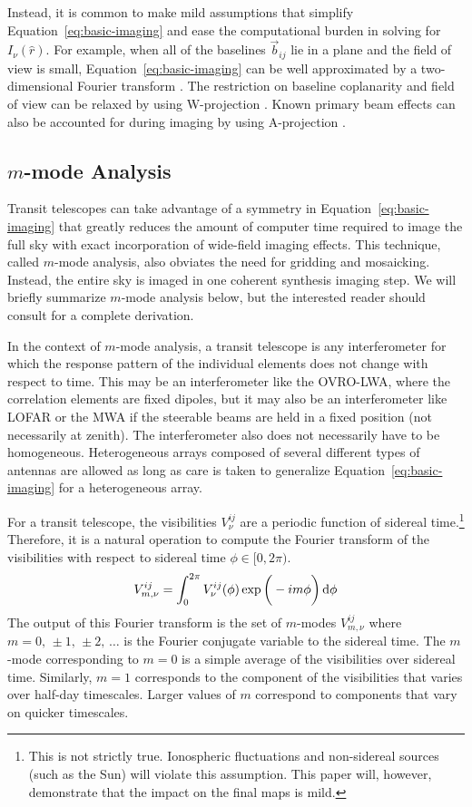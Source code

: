 \documentclass[twocolumn]{aastex61}
\renewcommand{\d}{{\rm d}}
\begin{document}
Instead, it is common to make mild assumptions that simplify Equation~\ref{eq:basic-imaging} and
ease the computational burden in solving for $I_\nu(\hat r)$. For example, when all of the baselines
$\vec b_{ij}$ lie in a plane and the field of view is small, Equation~\ref{eq:basic-imaging} can be
well approximated by a two-dimensional Fourier transform \citep{2001isra.book.....T}. The
restriction on baseline coplanarity and field of view can be relaxed by using W-projection
\citep{2008ISTSP...2..647C}. Known primary beam effects can also be accounted for during imaging by
using A-projection \citep{2013ApJ...770...91B}.

\subsection{$m$-mode Analysis}\label{sec:mmode-analysis}

Transit telescopes can take advantage of a symmetry in Equation~\ref{eq:basic-imaging} that greatly
reduces the amount of computer time required to image the full sky with exact incorporation of
wide-field imaging effects. This technique, called $m$-mode analysis, also obviates the need for
gridding and mosaicking. Instead, the entire sky is imaged in one coherent synthesis imaging step.
We will briefly summarize $m$-mode analysis below, but the interested reader should consult
\citet{2014ApJ...781...57S, 2015PhRvD..91h3514S} for a complete derivation.

In the context of $m$-mode analysis, a transit telescope is any interferometer for which the
response pattern of the individual elements does not change with respect to time. This may be an
interferometer like the OVRO-LWA, where the correlation elements are fixed dipoles, but it may also
be an interferometer like LOFAR or the MWA if the steerable beams are held in a fixed position (not
necessarily at zenith). The interferometer also does not necessarily have to be homogeneous.
Heterogeneous arrays composed of several different types of antennas are allowed as long as care is
taken to generalize Equation~\ref{eq:basic-imaging} for a heterogeneous array.

For a transit telescope, the visibilities $V^{ij}_\nu$ are a periodic function of sidereal
time.\footnote{
    This is not strictly true. Ionospheric fluctuations and non-sidereal sources (such as the Sun)
    will violate this assumption. This paper will, however, demonstrate that the impact on the final
    maps is mild.
}
Therefore, it is a natural operation to compute the Fourier transform of the visibilities with
respect to sidereal time $\phi\in[0,2\pi)$.
\begin{equation}
    V^{ij}_{m,\nu} = \int_0^{2\pi} V^{ij}_\nu(\phi)\exp\bigg(-im\phi\bigg)\,\d\phi
\end{equation}
The output of this Fourier transform is the set of $m$-modes $V^{ij}_{m,\nu}$ where
$m=0,\,\pm1,\,\pm2,\,\ldots$ is the Fourier conjugate variable to the sidereal time. The $m$-mode
corresponding to $m=0$ is a simple average of the visibilities over sidereal time. Similarly, $m=1$
corresponds to the component of the visibilities that varies over half-day timescales. Larger values
of $m$ correspond to components that vary on quicker timescales.
\end{document}
